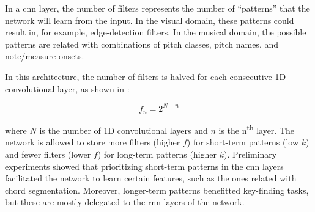 
In a \gls{cnn} layer, the number of filters represents the
number of ``patterns'' that the network will learn from the
input. In the visual domain, these patterns could result in,
for example, edge-detection filters. In the musical domain,
the possible patterns are related with combinations of pitch
classes, pitch names, and note/measure onsets.

In this architecture, the number of filters is halved for
each consecutive 1D convolutional layer, as shown in
:

\begin{equation}
    \label{eq:number_of_filters}
    f_n = 2^{N - n}
\end{equation}

where $N$ is the number of 1D convolutional layers and $n$
is the n\textsuperscript{th} layer. The network is allowed
to store more filters (higher $f$) for short-term patterns
(low $k$) and fewer filters (lower $f$) for long-term
patterns (higher $k$). Preliminary experiments showed that
prioritizing short-term patterns in the \gls{cnn} layers
facilitated the network to learn certain features, such as
the ones related with chord segmentation. Moreover,
longer-term patterns benefitted key-finding tasks, but these
are mostly delegated to the \gls{rnn} layers of the network. 

